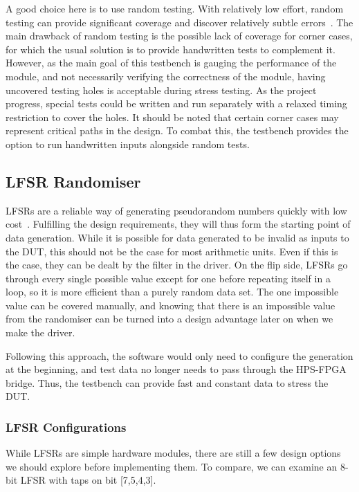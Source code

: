 A good choice here is to use random testing.
With relatively low effort, random testing can provide significant coverage and discover relatively subtle errors~\cite{Duran1}.
The main drawback of random testing is the possible lack of coverage for corner cases, for which the usual solution is to provide handwritten tests to complement it.
However, as the main goal of this testbench is gauging the performance of the module, and not necessarily verifying the correctness of the module, having uncovered testing holes is acceptable during stress testing.
As the project progress, special tests could be written and run separately with a relaxed timing restriction to cover the holes.
It should be noted that certain corner cases may represent critical paths in the design.
To combat this, the testbench provides the option to run handwritten inputs alongside random tests.

\subsection{LFSR Randomiser}

LFSRs are a reliable way of generating pseudorandom numbers quickly with low cost~\cite{Hazwani1}.
Fulfilling the design requirements, they will thus form the starting point of data generation.
While it is possible for data generated to be invalid as inputs to the DUT, this should not be the case for most arithmetic units.
Even if this is the case, they can be dealt by the filter in the driver.
On the flip side, LFSRs go through every single possible value except for one before repeating itself in a loop, so it is more efficient than a purely random data set.
The one impossible value can be covered manually, and knowing that there is an impossible value from the randomiser can be turned into a design advantage later on when we make the driver.

Following this approach, the software would only need to configure the generation at the beginning, and test data no longer needs to pass through the HPS-FPGA bridge.
Thus, the testbench can provide fast and constant data to stress the DUT.

\subsubsection{LFSR Configurations}

While LFSRs are simple hardware modules, there are still a few design options we should explore before implementing them.
To compare, we can examine an 8-bit LFSR with taps on bit [7,5,4,3].

